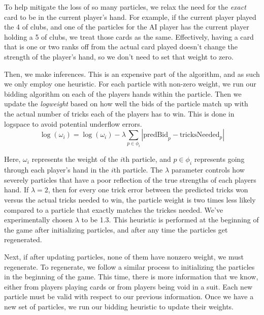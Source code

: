 \documentclass{article}
\begin{document}
To help mitigate the loss of so many particles, we relax the need for the \textit{exact} card to be in the current player's hand. For example, if the current player played the 4 of clubs, and one of the particles for the AI player has the current player holding a 5 of clubs, we treat those cards as the same. 
Effectively, having a card that is one or two ranks off from the actual card played doesn't change the strength of the player's hand, so we don't need to set that weight to zero. 

Then, we make inferences. This is an expensive part of the algorithm, and as such we only employ one heuristic. For each particle with non-zero weight, we run our bidding algorithm on each of the players hands within the particle. Then we update the \textit{logweight} based on how well the bids of the particle match up with the actual number of tricks each of the players has to win.
This is done in logspace to avoid potential underflow errors.
$$\log(\omega_i) = \log(\omega_i) - \lambda\sum_{p \in \phi_i}\left|\text{predBid}_p-\text{tricksNeeded}_p\right|$$

Here, $\omega_i$ represents the weight of the $i$th particle, and $p \in \phi_i$ represents going through each player's hand in the $i$th particle. The $\lambda$ parameter controls how severely particles that have a poor reflection of the true strengths of each players hand. If $\lambda = 2$, then for every one trick error between the predicted tricks won versus the actual tricks needed to win, the particle weight is two times less likely compared to a particle that exactly matches the trickes needed.
We've experimentally chosen $\lambda$ to be 1.3. This heuristic is performed at the beginning of the game after initializing particles, and after any time the particles get regenerated.

Next, if after updating particles, none of them have nonzero weight, we must regenerate. To regenerate, we follow a similar process to initializing the particles in the beginning of the game. This time, there is more information that we know, either from players playing cards or from players being void in a suit. Each new particle must be valid with respect to our previous information.
Once we have a new set of particles, we run our bidding heuristic to update their weights.
\end{document}
